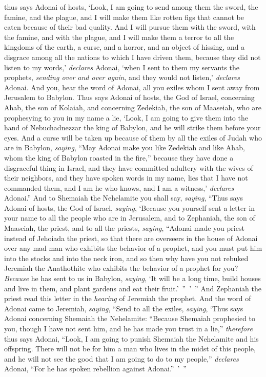 \begin{biblechapter}
\verse thus says Adonai of hosts, ‘Look, I am going to send among them the sword, the famine, and the plague, and I will make them like rotten figs that cannot be eaten because of their bad quality.
\verse And I will pursue them with the sword, with the famine, and with the plague, and I will make them a terror to all the kingdoms of the earth, a curse, and a horror, and an object of hissing, and a disgrace among all the nations to which I have driven them,
\verse because they did not listen to my words,’ \textit{declares} Adonai, ‘when I sent to them my servants the prophets, \textit{sending over and over again}, and they would not listen,’ \textit{declares} Adonai.
\verse And you, hear the word of Adonai, all you exiles whom I sent away from Jerusalem to Babylon.
\verse Thus says Adonai of hosts, the God of Israel, concerning Ahab, the son of Kolaiah, and concerning Zedekiah, the son of Maaseiah, who are prophesying to you in my name a lie, ‘Look, I am going to give them into the hand of Nebuchadnezzar the king of Babylon, and he will strike them before your eyes.
\verse And a curse will be taken up because of them by all the exiles of Judah who are in Babylon, \textit{saying}, “May Adonai make you like Zedekiah and like Ahab, whom the king of Babylon roasted in the fire,”
\verse because they have done a disgraceful thing in Israel, and they have committed adultery with the wives of their neighbors, and they have spoken words in my name, lies that I have not commanded them, and I am he who knows, and I am a witness,’ \textit{declares} Adonai.”
 And to Shemaiah the Nehelamite you shall say, \textit{saying},
\verse “Thus says Adonai of hosts, the God of Israel, \textit{saying}, ‘Because you yourself sent a letter in your name to all the people who are in Jerusalem, and to Zephaniah, the son of Maaseiah, the priest, and to all the priests, \textit{saying},
\verse “Adonai made you priest instead of Jehoiada the priest, so that there are overseers in the house of Adonai over any mad man who exhibits the behavior of a prophet, and you must put him into the stocks and into the neck iron,
\verse and so then why have you not rebuked Jeremiah the Anathothite who exhibits the behavior of a prophet for you?
\verse \textit{Because} he has sent to us in Babylon, \textit{saying}, ‘It will be a long time, build houses and live in them, and plant gardens and eat their fruit.’ ” ’ ”
\verse And Zephaniah the priest read this letter in the \textit{hearing} of Jeremiah the prophet.
 And the word of Adonai came to Jeremiah, \textit{saying},
\verse “Send to all the exiles, \textit{saying}, ‘Thus says Adonai concerning Shemaiah the Nehelamite: “Because Shemaiah prophesied to you, though I have not sent him, and he has made you trust in a lie,”
\verse \textit{therefore} thus says Adonai, “Look, I am going to punish Shemaiah the Nehelamite and his offspring. There will not be for him a man who lives in the midst of this people, and he will not see the good that I am going to do to my people,” \textit{declares} Adonai, “For he has spoken rebellion against Adonai.” ’ ”
\end{biblechapter}

